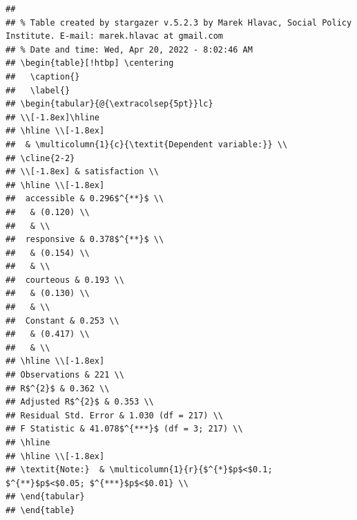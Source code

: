 \documentclass[
]{article}
\begin{document}
\begin{verbatim}
## 
## % Table created by stargazer v.5.2.3 by Marek Hlavac, Social Policy Institute. E-mail: marek.hlavac at gmail.com
## % Date and time: Wed, Apr 20, 2022 - 8:02:46 AM
## \begin{table}[!htbp] \centering 
##   \caption{} 
##   \label{} 
## \begin{tabular}{@{\extracolsep{5pt}}lc} 
## \\[-1.8ex]\hline 
## \hline \\[-1.8ex] 
##  & \multicolumn{1}{c}{\textit{Dependent variable:}} \\ 
## \cline{2-2} 
## \\[-1.8ex] & satisfaction \\ 
## \hline \\[-1.8ex] 
##  accessible & 0.296$^{**}$ \\ 
##   & (0.120) \\ 
##   & \\ 
##  responsive & 0.378$^{**}$ \\ 
##   & (0.154) \\ 
##   & \\ 
##  courteous & 0.193 \\ 
##   & (0.130) \\ 
##   & \\ 
##  Constant & 0.253 \\ 
##   & (0.417) \\ 
##   & \\ 
## \hline \\[-1.8ex] 
## Observations & 221 \\ 
## R$^{2}$ & 0.362 \\ 
## Adjusted R$^{2}$ & 0.353 \\ 
## Residual Std. Error & 1.030 (df = 217) \\ 
## F Statistic & 41.078$^{***}$ (df = 3; 217) \\ 
## \hline 
## \hline \\[-1.8ex] 
## \textit{Note:}  & \multicolumn{1}{r}{$^{*}$p$<$0.1; $^{**}$p$<$0.05; $^{***}$p$<$0.01} \\ 
## \end{tabular} 
## \end{table}
\end{verbatim}
\end{document}
